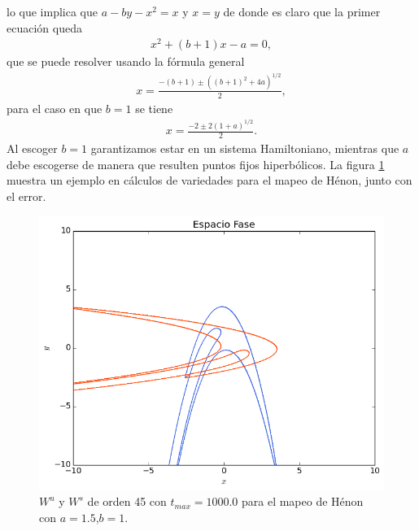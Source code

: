 lo que implica que $a-by-x^{2}=x$ y $x=y$ de donde es claro que la primer ecuación queda
\begin{eqnarray*}
x^{2}+(b+1)x-a=0, 
\end{eqnarray*}
que se puede resolver usando la fórmula general
\begin{eqnarray*}
x=\frac{-(b+1)\pm ((b+1)^{2}+4a)^{1/2} }{2},
\end{eqnarray*}
para el caso en que $b=1$ se tiene
\begin{eqnarray}
x=\frac{-2\pm 2(1+a)^{1/2} }{2}.
\end{eqnarray}
Al escoger $b=1$ garantizamos estar en un sistema Hamiltoniano, mientras que $a$ debe escogerse de manera que resulten puntos fijos hiperbólicos. La figura \ref{Henon1} muestra un ejemplo en cálculos de variedades para el mapeo de Hénon, junto con el error. 
\begin{figure}[H]
\centering
\includegraphics[scale=0.6]{henon1}
\caption{$W^{u}$ y $W^{s}$ de orden 45 con $t_{max}=1000.0$ para el mapeo de Hénon con $a=1.5$,$b=1$.}
\label{Henon1}
\end{figure}

